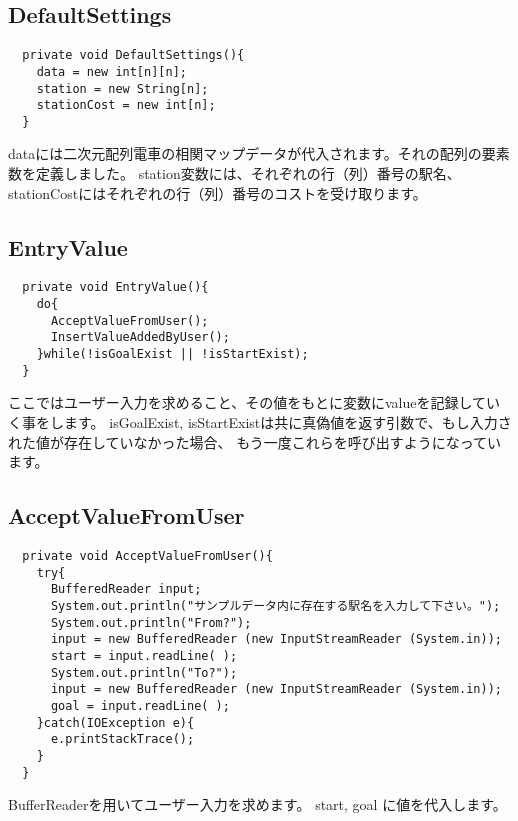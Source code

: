 \documentclass[titlepage]{jarticle}
\begin{document}
\subsection{DefaultSettings}
\begin{verbatim}
  private void DefaultSettings(){
    data = new int[n][n];
    station = new String[n];
    stationCost = new int[n];
  }
\end{verbatim}

dataには二次元配列電車の相関マップデータが代入されます。それの配列の要素数を定義しました。
station変数には、それぞれの行（列）番号の駅名、stationCostにはそれぞれの行（列）番号のコストを受け取ります。

\subsection{EntryValue}
\begin{verbatim}
  private void EntryValue(){
    do{
      AcceptValueFromUser();
      InsertValueAddedByUser();
    }while(!isGoalExist || !isStartExist);
  }
\end{verbatim}

ここではユーザー入力を求めること、その値をもとに変数にvalueを記録していく事をします。
isGoalExist, isStartExistは共に真偽値を返す引数で、もし入力された値が存在していなかった場合、
もう一度これらを呼び出すようになっています。

\subsection{AcceptValueFromUser}
\begin{verbatim}
  private void AcceptValueFromUser(){
    try{
      BufferedReader input;
      System.out.println("サンプルデータ内に存在する駅名を入力して下さい。");
      System.out.println("From?");
      input = new BufferedReader (new InputStreamReader (System.in));
      start = input.readLine( );
      System.out.println("To?");
      input = new BufferedReader (new InputStreamReader (System.in));
      goal = input.readLine( );
    }catch(IOException e){
      e.printStackTrace();
    }
  }
\end{verbatim}

BufferReaderを用いてユーザー入力を求めます。
start, goal に値を代入します。
\end{document}
